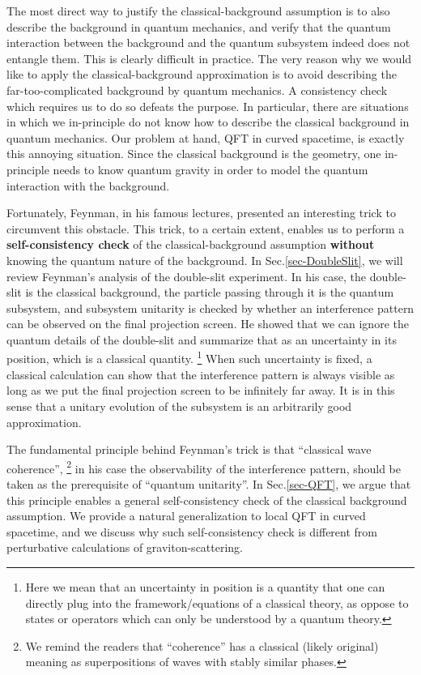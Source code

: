 \documentclass[aps,showpacs,onecolumn,floats,prd,superscriptaddress,nofootinbib]{revtex4-1}
\begin{document}
The most direct way to justify the classical-background assumption is to also describe the background in quantum mechanics, and verify that the quantum interaction between the background and the quantum subsystem indeed does not entangle them. 
This is clearly difficult in practice. 
The very reason why we would like to apply the classical-background approximation is to avoid describing the far-too-complicated background by quantum mechanics. 
A consistency check which requires us to do so defeats the purpose. 
In particular, there are situations in which we in-principle do not know how to describe the classical background in quantum mechanics. 
Our problem at hand, QFT in curved spacetime, is exactly this annoying situation. 
Since the classical background is the geometry, one in-principle needs to know quantum gravity in order to model the quantum interaction with the background. 

Fortunately, Feynman, in his famous lectures, presented an interesting trick to circumvent this obstacle. 
This trick, to a certain extent, enables us to perform a {\bf self-consistency check} of the classical-background assumption {\bf without} knowing the quantum nature of the background.
In Sec.\ref{sec-DoubleSlit}, we will review Feynman's analysis of the double-slit experiment. 
In his case, the double-slit is the classical background, the particle passing through it is the quantum subsystem, and subsystem unitarity is checked by whether an interference pattern can be observed on the final projection screen. 
He showed that we can ignore the quantum details of the double-slit and summarize that as an uncertainty in its position, which is a classical quantity.
\footnote{Here we mean that an uncertainty in position is a quantity that one can directly plug into the framework/equations of a classical theory, as oppose to states or operators which can only be understood by a quantum theory.} 
When such uncertainty is fixed, a classical calculation can show that the interference pattern is always visible as long as we put the final projection screen to be infinitely far away. 
It is in this sense that a unitary evolution of the subsystem is an arbitrarily good approximation.

The fundamental principle behind Feynman's trick is that ``classical wave coherence'',
\footnote{We remind the readers that ``coherence'' has a classical (likely original) meaning as superpositions of waves with stably similar phases.}
 in his case the observability of the interference pattern, should be taken as the prerequisite of ``quantum unitarity''. 
In Sec.\ref{sec-QFT}, we argue that this principle enables a general self-consistency check of the classical background assumption. 
We provide a natural generalization to local QFT in curved spacetime, and we discuss why such self-consistency check is different from perturbative calculations of graviton-scattering.
\end{document}
